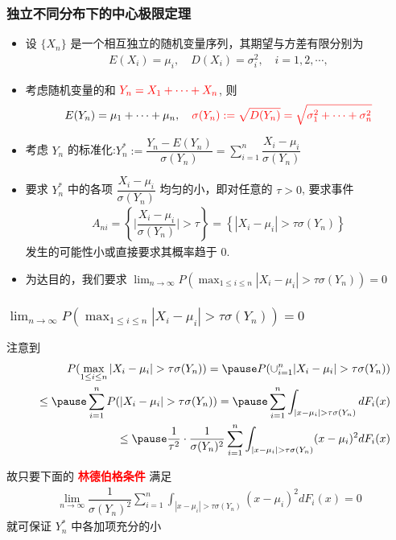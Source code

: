 \begin{frame}
	\frametitle{独立不同分布下的中心极限定理}
	\begin{itemize}[<+-|alert@+>]
		\item 设 $\{X_n\}$ 是一个相互独立的随机变量序列，其期望与方差有限分别为
		\begin{eqnarray*}
			E(X_i)=\mu_i, \quad D(X_i)=\sigma_i^2, \quad i=1,2,\cdots,
		\end{eqnarray*}
		\item 考虑随机变量的和 $\textcolor{red}{Y_n=X_1+\cdots+X_n}$, 则
		\begin{eqnarray*}
			E(Y_n)=\mu_1+\cdots+\mu_n,\quad \textcolor{red}{\sigma(Y_n):=\sqrt{D(Y_n)}=\sqrt{\sigma_1^2+\cdots+\sigma_n^2}}
		\end{eqnarray*}
		\item 考虑 $Y_n$ 的标准化:$ Y_n^*:=\dfrac{Y_n-E (Y_n)}{\sigma (Y_n)}=\sum_{i=1}^n\dfrac{X_i-\mu_i}{\sigma (Y_n)}$
		\item 要求 $Y_n^*$ 中的各项 $\dfrac{X_i-\mu_i}{\sigma (Y_n)}$ 均匀的小，即对任意的 $\tau>0$, 要求事件
		\begin{eqnarray*}
			A_{ni}=\left\{\big|\dfrac{X_i-\mu_i}{\sigma(Y_n)}\big|>\tau\right\}=\left\{|X_i-\mu_i|>\tau\sigma(Y_n)\right\}
		\end{eqnarray*}
		发生的可能性小或直接要求其概率趋于 0.
		\item 为达目的，我们要求 $\lim_{n\rightarrow\infty} P (\max_{1\le i\le n}|X_i-\mu_i|>\tau\sigma (Y_n))=0$
	\end{itemize}
\end{frame}
\begin{frame}
	\frametitle{$\lim_{n\rightarrow\infty}P(\max_{1\le i\le n}|X_i-\mu_i|>\tau\sigma(Y_n))=0$}
	注意到
	\begin{eqnarray*}
		&&P(\max_{1\le i\le n}|X_i-\mu_i|>\tau\sigma(Y_n))=\pause P(\cup_{i=1}^n|X_i-\mu_i|>\tau\sigma(Y_n))\\
		&&\le\pause \sum_{i=1}^nP(|X_i-\mu_i|>\tau\sigma(Y_n))=\pause \sum_{i=1}^n\int_{|x-\mu_i|>\tau\sigma(Y_n)}dF_i(x)\\
		&&\le \pause \dfrac{1}{\tau^2}\cdot\dfrac{1}{\sigma(Y_n)^2}\sum_{i=1}^n\int_{|x-\mu_i|>\tau\sigma(Y_n)}(x-\mu_i)^2dF_i(x)
	\end{eqnarray*}

	\pause 故只要下面的 \textcolor{red}{\bf 林德伯格条件} 满足
	\begin{eqnarray*}%
		\lim_{n\rightarrow\infty} \dfrac{1}{\sigma(Y_n)^2}\sum_{i=1}^n\int_{|x-\mu_i|>\tau\sigma(Y_n)}(x-\mu_i)^2dF_i(x)=0
	\end{eqnarray*}
	就可保证 $Y_n^*$ 中各加项充分的小


\end{frame}

